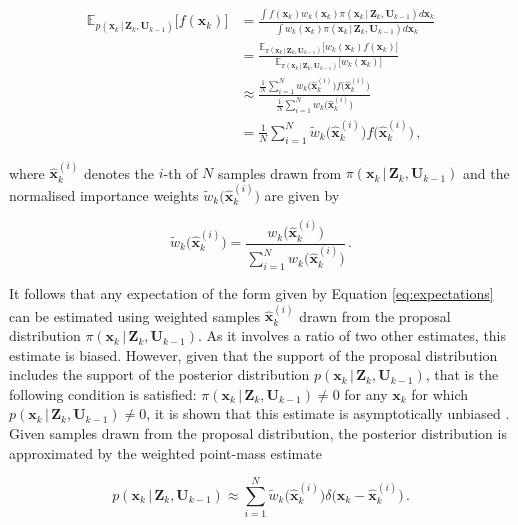 \begin{equation}
\begin{split}
  \mathbb{E}_{p(\bm{x}_k\,|\,\bm{Z}_{k}, \bm{U}_{k-1})}\big[f(\bm{x}_k)\big] &= \frac{\int f(\bm{x}_k) w_k(\bm{x}_k) \pi(\bm{x}_k\,|\,\bm{Z}_{k}, \bm{U}_{k-1}) d\bm{x}_k}{\int w_k(\bm{x}_k) \pi(\bm{x}_k\,|\,\bm{Z}_{k}, \bm{U}_{k-1})d\bm{x}_{k}} \\
  &= \frac{\mathbb{E}_{\pi(\bm{x}_k\,|\,\bm{Z}_{k}, \bm{U}_{k-1})}\big[w_k(\bm{x}_k)f(\bm{x}_k)\big]}{\mathbb{E}_{\pi(\bm{x}_k\,|\,\bm{Z}_{k}, \bm{U}_{k-1})}\big[w_k(\bm{x}_k)\big]} \\
  &\approx \frac{\frac{1}{N} \sum^N_{i = 1} w_k\Big(\hat{\bm{x}}^{(i)}_k\Big)f\Big(\hat{\bm{x}}^{(i)}_k\Big)}{\frac{1}{N} \sum^N_{i = 1} w_k\Big(\hat{\bm{x}}^{(i)}_k\Big)} \\
  &= \frac{1}{N} \sum^N_{i = 1} \tilde{w}_k\Big(\hat{\bm{x}}^{(i)}_k\Big)f\Big(\hat{\bm{x}}^{(i)}_k\Big)
  \,,
\end{split}
\end{equation}

\noindent
where $\hat{\bm{x}}^{(i)}_k$ denotes the $i$-th of $N$ samples drawn from $\pi(\bm{x}_k\,|\,\bm{Z}_{k}, \bm{U}_{k-1})$ and the normalised importance weights $\tilde{w}_k\Big(\hat{\bm{x}}^{(i)}_k\Big)$ are given by 

\begin{equation}
  \tilde{w}_k\Big(\hat{\bm{x}}^{(i)}_k\Big) = \frac{w_k\Big(\hat{\bm{x}}^{(i)}_k\Big)}{\sum^N_{i = 1} w_k\Big(\hat{\bm{x}}^{(i)}_k\Big)} \,.
\end{equation}


It follows that any expectation of the form given by Equation \ref{eq:expectations} can be estimated using weighted samples $\hat{\bm{x}}^{(i)}_k$ drawn from the proposal distribution $\pi(\bm{x}_k\,|\,\bm{Z}_{k}, \bm{U}_{k-1})$. As it involves a ratio of two other estimates, this estimate is biased. However, given that the support of the proposal distribution includes the support of the posterior distribution $p(\bm{x}_k\,|\,\bm{Z}_{k}, \bm{U}_{k-1})$, that is the following condition is satisfied: $\pi(\bm{x}_k\,|\,\bm{Z}_{k}, \bm{U}_{k-1}) \neq 0$ for any $\bm{x}_k$ for which $p(\bm{x}_k\,|\,\bm{Z}_{k}, \bm{U}_{k-1}) \neq 0$, it is shown that this estimate is asymptotically unbiased \cite{doucet1998sequential}. Given samples drawn from the proposal distribution, the posterior distribution is approximated by the weighted point-mass estimate

\begin{equation}\label{eq:weighted_empirical_distribution}
  p(\bm{x}_k\,|\,\bm{Z}_{k}, \bm{U}_{k-1}) \approx \sum^N_{i = 1} \tilde{w}_k\Big(\hat{\bm{x}}^{(i)}_k\Big) \delta\Big(\bm{x}_{k} - \hat{\bm{x}}^{(i)}_k \Big) \,.
\end{equation}

